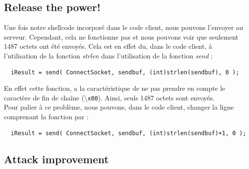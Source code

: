 \subsection{Release the power!}
Une fois notre shellcode incorporé dans le code client, nous pouvons l'envoyer au serveur. Cependant, cela ne fonctionne pas et nous pouvons voir que seulement 1487 octets ont été envoyés. Cela est en effet du, dans le code client, à l'utilisation de la fonction \textit{strlen} dans l'utilisation de la fonction \textit{send} :
\begin{verbatim}
  iResult = send( ConnectSocket, sendbuf, (int)strlen(sendbuf), 0 );
\end{verbatim}
En effet cette fonction, a la caractéristique de ne pas prendre en compte le caractère de fin de chaîne (\textbackslash\verb|x00|). Ainsi, seuls 1487 octets sont envoyés.\\
Pour palier à ce problème, nous pouvons, dans le code client, changer la ligne comprenant la fonction par :
\begin{verbatim}
  iResult = send( ConnectSocket, sendbuf, (int)strlen(sendbuf)+1, 0 );
\end{verbatim}
\subsection{Attack improvement}